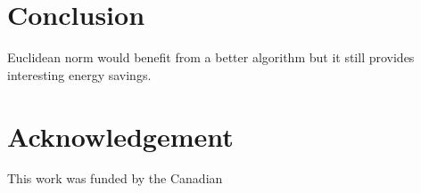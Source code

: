 \documentclass[10pt, conference, compsocconf]{IEEEtran}
\begin{document}





\section{Conclusion}

Euclidean norm would benefit from a better algorithm but it still
provides interesting energy savings.

\section*{Acknowledgement}
This work was funded by the Canadian 



\end{document}
